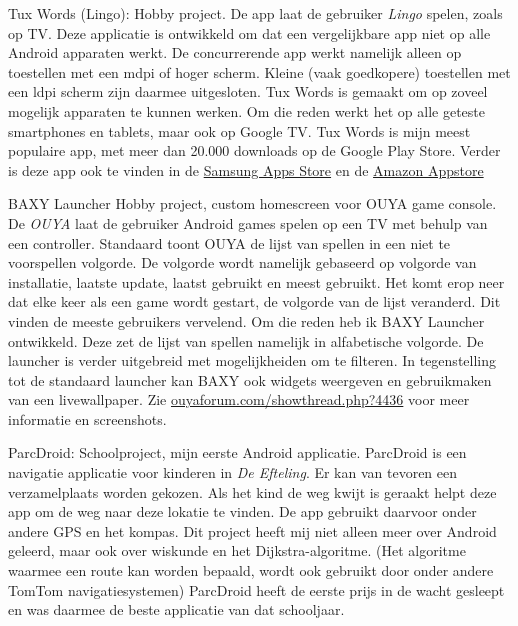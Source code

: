 \documentclass[10pt,a4paper]{article}
\begin{document}
\inlineheadsection
{Tux Words (Lingo):}
{Hobby project. De app laat de gebruiker \emph{Lingo} spelen, zoals op TV. Deze applicatie is ontwikkeld om dat een vergelijkbare app niet op alle Android apparaten werkt. De concurrerende app werkt namelijk alleen op toestellen met een mdpi of hoger scherm. Kleine (vaak goedkopere) toestellen met een ldpi scherm zijn daarmee uitgesloten. Tux Words is gemaakt om op zoveel mogelijk apparaten te kunnen werken. Om die reden werkt het op alle geteste smartphones en tablets, maar ook op Google TV. Tux Words is mijn meest populaire app, met meer dan 20.000 downloads op de Google Play Store. Verder is deze app ook te vinden in de \href{http://apps.samsung.com/venus/topApps/topAppsDetail.as?productId=000000498917}{Samsung Apps Store} en de \href{http://www.amazon.com/FrankkieNL-Tux-Words-Lingo/dp/B0096M4AYU/}{Amazon Appstore}}

\inlineheadsection
{BAXY Launcher}
{Hobby project, custom homescreen voor OUYA game console. De \emph{OUYA} laat de gebruiker Android games spelen op een TV met behulp van een controller. Standaard toont OUYA de lijst van spellen in een niet te voorspellen volgorde. De volgorde wordt namelijk gebaseerd op volgorde van installatie, laatste update, laatst gebruikt en meest gebruikt. Het komt erop neer dat elke keer als een game wordt gestart, de volgorde van de lijst veranderd. Dit vinden de meeste gebruikers vervelend. Om die reden heb ik BAXY Launcher ontwikkeld. Deze zet de lijst van spellen namelijk in alfabetische volgorde. De launcher is verder uitgebreid met mogelijkheiden om te filteren. In tegenstelling tot de standaard launcher kan BAXY ook widgets weergeven en gebruikmaken van een livewallpaper. Zie \href{http://ouyaforum.com/showthread.php?4436-BAXY-Custom-Launcher}{ouyaforum.com/showthread.php?4436} voor meer informatie en screenshots.}


\inlineheadsection
  {ParcDroid:}
  {Schoolproject, mijn eerste Android applicatie. ParcDroid is een navigatie applicatie voor kinderen in \emph{De Efteling}. Er kan van tevoren een verzamelplaats worden gekozen. Als het kind de weg kwijt is geraakt helpt deze app om de weg naar deze lokatie te vinden. De app gebruikt daarvoor onder andere GPS en het kompas. Dit project heeft mij niet alleen meer over Android geleerd, maar ook over wiskunde en het Dijkstra-algoritme. (Het algoritme waarmee een route kan worden bepaald, wordt ook gebruikt door onder andere TomTom navigatiesystemen) ParcDroid heeft de eerste prijs in de wacht gesleept en was daarmee de beste applicatie van dat schooljaar.}
  
\end{document}

